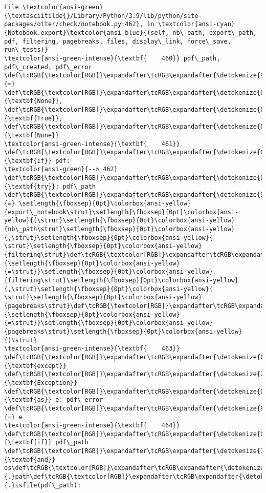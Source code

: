 \documentclass[11pt]{article}
\begin{document}
\begin{Verbatim}[commandchars=\\\{\}, frame=single, framerule=2mm, rulecolor=\color{outerrorbackground}]
File \textcolor{ansi-green}{\textasciitilde{}/Library/Python/3.9/lib/python/site-packages/otter/check/notebook.py:462}, in \textcolor{ansi-cyan}{Notebook.export}\textcolor{ansi-blue}{(self, nb\_path, export\_path, pdf, filtering, pagebreaks, files, display\_link, force\_save, run\_tests)}
\textcolor{ansi-green-intense}{\textbf{    460}} pdf\_path, pdf\_created, pdf\_error \def\tcRGB{\textcolor[RGB]}\expandafter\tcRGB\expandafter{\detokenize{98,98,98}}{=} \def\tcRGB{\textcolor[RGB]}\expandafter\tcRGB\expandafter{\detokenize{0,135,0}}{\textbf{None}}, \def\tcRGB{\textcolor[RGB]}\expandafter\tcRGB\expandafter{\detokenize{0,135,0}}{\textbf{True}}, \def\tcRGB{\textcolor[RGB]}\expandafter\tcRGB\expandafter{\detokenize{0,135,0}}{\textbf{None}}
\textcolor{ansi-green-intense}{\textbf{    461}} \def\tcRGB{\textcolor[RGB]}\expandafter\tcRGB\expandafter{\detokenize{0,135,0}}{\textbf{if}} pdf:
\textcolor{ansi-green}{--> 462}     \def\tcRGB{\textcolor[RGB]}\expandafter\tcRGB\expandafter{\detokenize{0,135,0}}{\textbf{try}}: pdf\_path \def\tcRGB{\textcolor[RGB]}\expandafter\tcRGB\expandafter{\detokenize{98,98,98}}{=} \setlength{\fboxsep}{0pt}\colorbox{ansi-yellow}{export\_notebook\strut}\setlength{\fboxsep}{0pt}\colorbox{ansi-yellow}{(\strut}\setlength{\fboxsep}{0pt}\colorbox{ansi-yellow}{nb\_path\strut}\setlength{\fboxsep}{0pt}\colorbox{ansi-yellow}{,\strut}\setlength{\fboxsep}{0pt}\colorbox{ansi-yellow}{ \strut}\setlength{\fboxsep}{0pt}\colorbox{ansi-yellow}{filtering\strut}\def\tcRGB{\textcolor[RGB]}\expandafter\tcRGB\expandafter{\detokenize{98,98,98}}{\setlength{\fboxsep}{0pt}\colorbox{ansi-yellow}{=\strut}}\setlength{\fboxsep}{0pt}\colorbox{ansi-yellow}{filtering\strut}\setlength{\fboxsep}{0pt}\colorbox{ansi-yellow}{,\strut}\setlength{\fboxsep}{0pt}\colorbox{ansi-yellow}{ \strut}\setlength{\fboxsep}{0pt}\colorbox{ansi-yellow}{pagebreaks\strut}\def\tcRGB{\textcolor[RGB]}\expandafter\tcRGB\expandafter{\detokenize{98,98,98}}{\setlength{\fboxsep}{0pt}\colorbox{ansi-yellow}{=\strut}}\setlength{\fboxsep}{0pt}\colorbox{ansi-yellow}{pagebreaks\strut}\setlength{\fboxsep}{0pt}\colorbox{ansi-yellow}{)\strut}
\textcolor{ansi-green-intense}{\textbf{    463}}     \def\tcRGB{\textcolor[RGB]}\expandafter\tcRGB\expandafter{\detokenize{0,135,0}}{\textbf{except}} \def\tcRGB{\textcolor[RGB]}\expandafter\tcRGB\expandafter{\detokenize{215,95,95}}{\textbf{Exception}} \def\tcRGB{\textcolor[RGB]}\expandafter\tcRGB\expandafter{\detokenize{0,135,0}}{\textbf{as}} e: pdf\_error \def\tcRGB{\textcolor[RGB]}\expandafter\tcRGB\expandafter{\detokenize{98,98,98}}{=} e
\textcolor{ansi-green-intense}{\textbf{    464}}     \def\tcRGB{\textcolor[RGB]}\expandafter\tcRGB\expandafter{\detokenize{0,135,0}}{\textbf{if}} pdf\_path \def\tcRGB{\textcolor[RGB]}\expandafter\tcRGB\expandafter{\detokenize{175,0,255}}{\textbf{and}} os\def\tcRGB{\textcolor[RGB]}\expandafter\tcRGB\expandafter{\detokenize{98,98,98}}{.}path\def\tcRGB{\textcolor[RGB]}\expandafter\tcRGB\expandafter{\detokenize{98,98,98}}{.}isfile(pdf\_path):


\end{Verbatim}
\end{document}
